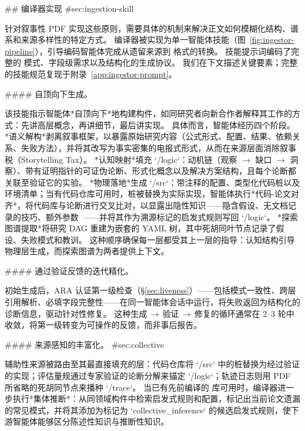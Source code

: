\begin{markdown}
## 编译器实现 {#sec:ingestion-skill}

针对叙事性 PDF 实现这些原则，需要具体的机制来解决正文如何模糊化结构、谱系和来源多样性的特定方式。
编译器被实现为单一智能体技能（图~\ref{fig:ingestor-pipeline}），引导编码智能体完成从遗留来源到 \ara{} 格式的转换。
技能提示词编码了完整的 \ara{} 模式、字段级需求以及结构化的生成协议。
我们在下文描述关键要素；完整的技能规范复现于附录~\ref{app:ingestor-prompt}。

#### 自顶向下生成。

该技能指示智能体*自顶向下*地构建构件，如同研究者向新合作者解释其工作的方式：先讲高层概念，再讲细节，最后讲实现。
具体而言，智能体经历四个阶段。
*语义解构*剥离叙事框架，以暴露原始研究内容（公式形式、配置、结果、依赖关系、失败方法），并将其改写为事实密集的电报式形式，从而在来源层面消除叙事税（Storytelling Tax）。
*认知映射*填充 `/logic`：动机链（观察 $\to$ 缺口 $\to$ 洞察）、带有证明指针的可证伪论断、形式化概念以及解决方案结构，且每个论断都关联至验证它的实验。
*物理落地*生成 `/src`：带注释的配置、类型化代码桩以及环境清单；当有代码仓库可用时，桩被替换为实际实现，智能体执行*代码-论文对齐*，将代码库与论断进行交叉比对，以显露出隐性知识——隐含假设、无文档记录的技巧、额外参数~\citep{li2026tacit}——并将其作为溯源标记的启发式规则写回 `/logic`。
*探索图谱提取*将研究 DAG 重建为嵌套的 YAML 树，其中死胡同叶节点记录了假设、失败模式和教训。
这种顺序确保每一层都受其上一层的指导：认知结构引导物理层生成，而探索图谱为两者提供上下文。

#### 通过验证反馈的迭代精化。

初始生成后，ARA 认证第一级检查（\S\ref{sec:liveness}）——包括模式一致性、跨层引用解析、必填字段完整性——在同一智能体会话中运行，将失败返回为结构化的诊断信息，驱动针对性修复。
这种生成$\,\to\,$验证$\,\to\,$修复的循环通常在 2--3 轮中收敛，将第一级转变为可操作的反馈，而非事后报告。

#### 来源感知的丰富化。 {#sec:collective}

辅助性来源被路由至其最直接填充的层：代码仓库将 `/src` 中的桩替换为经过验证的实现；评估量规通过专家验证的论断分解来锚定 `/logic`；轨迹日志则用 PDF 所省略的死胡同节点来播种 `/trace`。
当已有先前编译的 \ara{} 库可用时，编译器进一步执行*集体推断*：从同领域构件中检索启发式规则和配置，标记出当前论文遗漏的常见模式，并将其添加为标记为 `collective_inference` 的候选启发式规则，使下游智能体能够区分陈述性知识与推断性知识。
\end{markdown}
